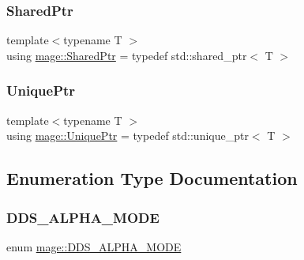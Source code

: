 \subsubsection{\texorpdfstring{Shared\+Ptr}{SharedPtr}}
{\footnotesize\ttfamily template$<$typename T $>$ \\
using \hyperlink{namespacemage_a1e01ae66713838a7a67d30e44c67703e}{mage\+::\+Shared\+Ptr} = typedef std\+::shared\+\_\+ptr$<$ T $>$}

\hypertarget{namespacemage_a8c307fbcc33bce9b7f2aa4c26c3b95cf}{}\label{namespacemage_a8c307fbcc33bce9b7f2aa4c26c3b95cf} 
\subsubsection{\texorpdfstring{Unique\+Ptr}{UniquePtr}}
{\footnotesize\ttfamily template$<$typename T $>$ \\
using \hyperlink{namespacemage_a8c307fbcc33bce9b7f2aa4c26c3b95cf}{mage\+::\+Unique\+Ptr} = typedef std\+::unique\+\_\+ptr$<$ T $>$}



\subsection{Enumeration Type Documentation}
\hypertarget{namespacemage_a0c586a2bad862f4858900ca121ca80c2}{}\label{namespacemage_a0c586a2bad862f4858900ca121ca80c2} 
\subsubsection{\texorpdfstring{D\+D\+S\+\_\+\+A\+L\+P\+H\+A\+\_\+\+M\+O\+DE}{DDS\_ALPHA\_MODE}}
{\footnotesize\ttfamily enum \hyperlink{namespacemage_a0c586a2bad862f4858900ca121ca80c2}{mage\+::\+D\+D\+S\+\_\+\+A\+L\+P\+H\+A\+\_\+\+M\+O\+DE}}

